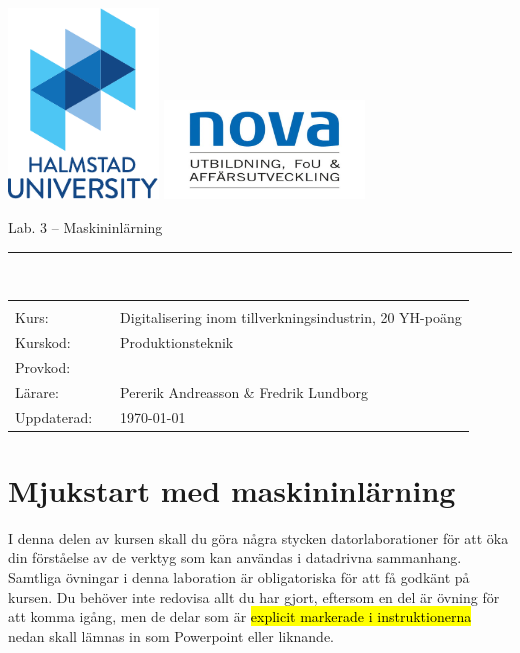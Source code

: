 \documentclass{article}
\newcommand{\kursnamn}{Digitalisering inom tillverknings\-industrin, 20 YH-poäng}
\newcommand{\kurskod}{Produktionsteknik}
\newcommand{\provkod}{}
\begin{document}
  \includegraphics[width=0.3\textwidth]{figures/HH_ENG_color_small.pdf}
  \hspace{3cm}
  \includegraphics[width=0.4\textwidth]{figures/novalogga.jpg}

  \vspace{5mm}
	\begin{center}
	{\Huge{}Lab. 3 -- Maskininlärning}
	\end{center}
\noindent\rule{\textwidth}{2pt}
\\


{\Large
\begin{tabular}{p{2cm}p{1cm}p{8cm}}
&  &  \\
Kurs: & 	& 	\kursnamn \\
Kurskod: & & \kurskod \\
Provkod: &  & \provkod \\
L\"arare: &  & Pererik Andreasson \& Fredrik Lundborg\\
Uppdaterad: & & \today
\end{tabular}
}

\pagebreak

\tableofcontents

\section{Mjukstart med maskininlärning}
I denna delen av kursen skall du göra några stycken datorlaborationer för att öka din förståelse av de verktyg som kan användas i datadrivna sammanhang. 
Samtliga övningar i denna laboration är obligatoriska för att få godkänt på kursen. Du behöver inte redovisa allt du har gjort, eftersom en del är övning för att komma igång, men de delar som är \hl{explicit markerade i instruktionerna} nedan skall lämnas in som Powerpoint eller liknande. 
\end{document}
